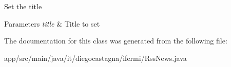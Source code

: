 Set the title 
\begin{DoxyParams}{Parameters}
{\em title} & Title to set \\
\hline
\end{DoxyParams}


The documentation for this class was generated from the following file\+:\begin{DoxyCompactItemize}
\item 
app/src/main/java/it/diegocastagna/ifermi/Rss\+News.\+java\end{DoxyCompactItemize}
